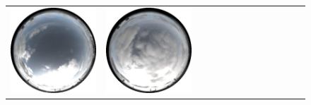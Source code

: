 \documentclass{report}
\begin{document}
\begin{figure}[!th]
\begin{tabular}{@{}rcccccccccccc@{}}
    \includegraphics[width=\customwidth]{./figures/database/20141108_120025.jpg} &
    \includegraphics[width=\customwidth]{./figures/database/20141108_123025.jpg} &

\end{tabular}
\end{figure}
\end{document}
